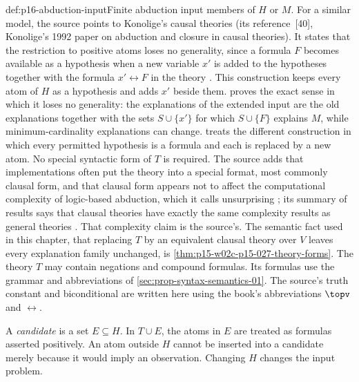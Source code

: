 \begin{hbdefinition}{def:p16-abduction-input}{Finite abduction input}
members of \(H\) or \(M\). For a similar model, the source points to
Konolige's causal theories (its reference~[40], Konolige's 1992 paper
on abduction and closure in causal theories). It states that the restriction
to positive atoms loses no
generality, since a formula \(F\) becomes available as a hypothesis when
a new variable \(x'\) is added to the hypotheses together with the
formula \(x'\leftrightarrow F\) in the theory
\cite[manuscript p.~10]{EiterGottlobAbductionManuscript}.
This construction keeps every atom of \(H\) as a hypothesis and adds
\(x'\) beside them.  proves
the exact sense in which it loses no generality: the explanations of the
extended input are the old explanations together with the sets
\(S\cup\{x'\}\) for which \(S\cup\{F\}\) explains \(M\), while
minimum-cardinality explanations can change.
 treats the different
construction in which every permitted hypothesis is a formula and each is
replaced by a new atom.
No special syntactic form of \(T\) is required. The source adds that
implementations often put the theory into a special format, most commonly
clausal form, and that clausal form appears not to affect the
computational complexity of logic-based abduction, which it calls
unsurprising \cite[manuscript p.~10]{EiterGottlobAbductionManuscript};
its summary of results says that clausal theories have exactly the same
complexity results as general theories
\cite[manuscript p.~8]{EiterGottlobAbductionManuscript}. That complexity
claim is the source's. The semantic fact used in this chapter, that
replacing \(T\) by an equivalent clausal theory over \(V\) leaves every
explanation family unchanged, is
\cref{thm:p15-w02c-p15-027-theory-forms}.
The theory \(T\) may contain negations
and compound formulas. Its formulas use the grammar and abbreviations of
\cref{sec:prop-syntax-semantics-01}.
The source's truth constant and biconditional are written here using
the book's abbreviations \(\topv\) and \(\leftrightarrow\).

A \emph{candidate} is a set \(E\subseteq H\). In \(T\cup E\),
the atoms in \(E\) are treated as formulas asserted positively.
An atom outside \(H\) cannot be inserted into a candidate merely because
it would imply an observation. Changing \(H\) changes the input problem.
\end{hbdefinition}

